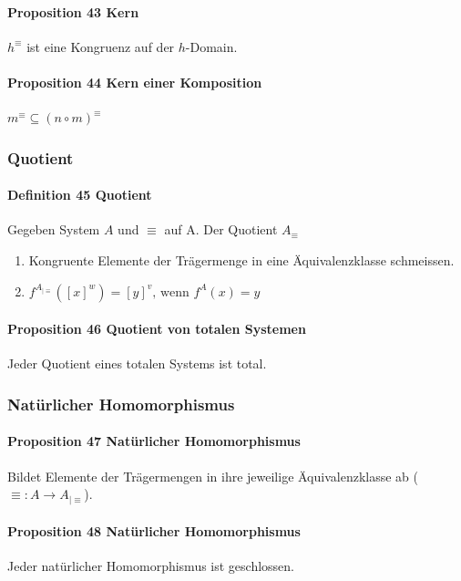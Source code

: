\paragraph{Proposition 43 Kern}
$h^\equiv$ ist eine Kongruenz auf der $h$-Domain.

\paragraph{Proposition 44 Kern einer Komposition}
$m^\equiv \subseteq (n \circ m)^\equiv$ 


\subsubsection{Quotient}

\paragraph{Definition 45 Quotient}
Gegeben System $A$ und $\equiv$ auf A. Der Quotient $A_\equiv$ 
\begin{enumerate}
\item Kongruente Elemente der Trägermenge in eine Äquivalenzklasse schmeissen.
\item $f^{A_{|\equiv}}([x]^{w})=[y]^{v},\,\textrm{wenn }f^{A}(x)=y$
\end{enumerate}

\paragraph{Proposition 46 Quotient von totalen Systemen}
Jeder Quotient eines totalen Systems ist total.

\subsubsection{Natürlicher Homomorphismus}

\paragraph{Proposition 47 Natürlicher Homomorphismus}
Bildet Elemente der Trägermengen in ihre jeweilige Äquivalenzklasse ab ($\equiv : A \rightarrow A_{|\equiv}$). 

\paragraph{Proposition 48 Natürlicher Homomorphismus}
Jeder natürlicher Homomorphismus ist geschlossen.

